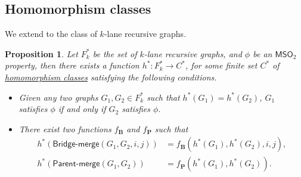 \documentclass[11pt]{article}
\newtheorem{proposition}[lemma]{Proposition}
\theoremstyle{definition}
\theoremstyle{remark}
\newcommand{\MSO}{\mathsf{MSO}_2}
\newcommand{\pmerge}{\mathsf{Parent}\text{-}\mathsf{merge}}
\newcommand{\bmerge}{\mathsf{Bridge}\text{-}\mathsf{merge}}
\newcommand{\fb}{f_{\mathbf{B}}}
\newcommand{\fp}{f_{\mathbf{P}}}
\begin{document}
\subsection{Homomorphism classes}\label{sect:classes}

We extend  to the class of $k$-lane recursive graphs.

\begin{proposition}
    \label{homomorphism-class-mapping2}
    Let $F_k^\ast$ be the set of $k$-lane recursive graphs, and $\phi$ be an $\MSO$ property, then there exists a function $h^\ast : F_k^\ast \to C^\ast$, for some finite set $C^\ast$ of \ul{homomorphism classes} satisfying the following conditions.
    \begin{itemize}
        \item Given any two graphs $G_1, G_2 \in F_k^\ast$ such that $h^\ast(G_1) = h^\ast(G_2)$, $G_1$ satisfies $\phi$ if and only if $G_2$ satisfies $\phi$.
        \item There exist two functions $\fb$ and $\fp$ such that 
\begin{align*}
     h^\ast(\bmerge(G_1, G_2, i, j)) &= \fb(h^\ast(G_1), h^\ast(G_2), i, j),\\
    h^\ast(\pmerge(G_1, G_2)) &= \fp(h^\ast(G_1), h^\ast(G_2)).
\end{align*}
    \end{itemize}
\end{proposition}
\end{document}
